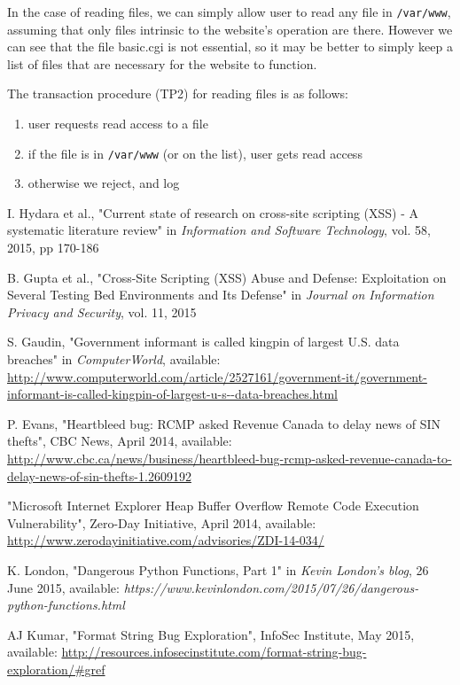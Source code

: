 \documentclass[11pt,journal]{article}
\begin{document}
	In the case of reading files, we can simply allow user to read any file in \texttt{/var/www}, assuming that only files intrinsic to the website's operation are there. However we can see that the file basic.cgi is not essential, so it may be better to simply keep a list of files that are necessary for the website to function.
	
	The transaction procedure (TP2) for reading files is as follows:
	\begin{enumerate}
		\item user requests read access to a file
		\item if the file is in \texttt{/var/www} (or on the list), user gets read access
		\item otherwise we reject, and log
	\end{enumerate}
	
	
	
	
	
	
\begin{thebibliography}{1}
	
	I. Hydara et al., "Current state of research on cross-site scripting (XSS) - A systematic literature review" in \emph{Information and Software Technology}, vol. 58, 2015, pp 170-186
	
	B. Gupta et al., "Cross-Site Scripting (XSS) Abuse and Defense: Exploitation on Several Testing Bed Environments and Its Defense" in \emph{Journal on Information Privacy and Security}, vol. 11, 2015
	
	S. Gaudin, "Government informant is called kingpin of largest U.S. data breaches" in \emph{ComputerWorld}, available:\\ \url{http://www.computerworld.com/article/2527161/government-it/government-informant-is-called-kingpin-of-largest-u-s--data-breaches.html}
	
	P. Evans, "Heartbleed bug: RCMP asked Revenue Canada to delay news of SIN thefts", CBC News, April 2014, available: \url{http://www.cbc.ca/news/business/heartbleed-bug-rcmp-asked-revenue-canada-to-delay-news-of-sin-thefts-1.2609192}
	
	"Microsoft Internet Explorer Heap Buffer Overflow Remote Code Execution Vulnerability", Zero-Day Initiative, April 2014, available: \url{http://www.zerodayinitiative.com/advisories/ZDI-14-034/}
	
	
	\cite{Kevin London}
	K. London, "Dangerous Python Functions, Part 1" in \emph{Kevin London's blog}, 26 June 2015, available: \emph{https://www.kevinlondon.com/2015/07/26/dangerous-python-functions.html}
	
	AJ Kumar, "Format String Bug Exploration", InfoSec Institute, May 2015, available: \url{http://resources.infosecinstitute.com/format-string-bug-exploration/#gref}
\end{thebibliography}
	
\end{document}
